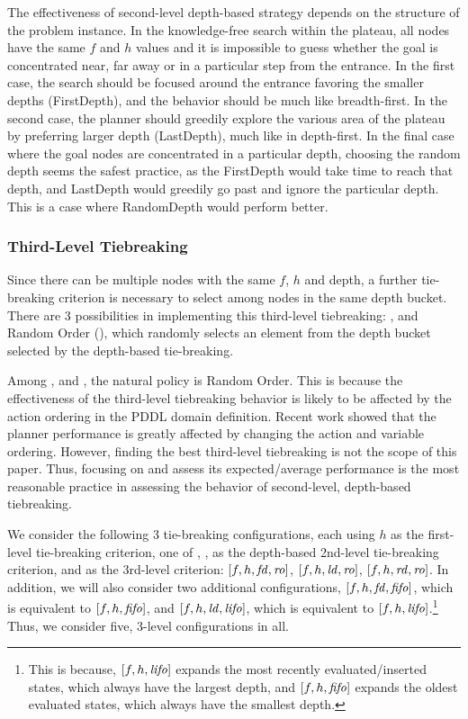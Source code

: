 The effectiveness of second-level depth-based strategy depends on the
structure of the problem instance.  In the knowledge-free search within
the plateau, all nodes have the same $f$ and $h$ values
and it is impossible to guess whether the goal is concentrated near, far
away or in a particular step from the entrance.  In the first case, the
search should be focused around the entrance favoring the smaller depths
(FirstDepth), and the behavior should be much like breadth-first. In the
second case, the planner should greedily explore the various area of the
plateau by preferring larger depth (LastDepth), much like in
depth-first. In the final case where the goal nodes are concentrated in
a particular depth, choosing the random depth seems the safest practice,
as the FirstDepth would take time to reach that depth, and LastDepth
would greedily go past and ignore the particular depth. This is a case
where RandomDepth would perform better.

\subsubsection{Third-Level Tiebreaking}

Since there can be multiple nodes with the same $f$, $h$ and depth,
a further tie-breaking criterion is necessary to select among nodes in the same depth bucket.
There are 3 possibilities in implementing this third-level tiebreaking:
\fifo, \lifo and Random Order (\ro), which
randomly selects an element from the depth bucket selected by the depth-based tie-breaking.

Among \fifo, \lifo and \ro, the natural policy is Random Order.
This is because the effectiveness of the third-level tiebreaking behavior
is likely to be affected by the action ordering in the PDDL domain
definition.  Recent work \cite{vallati2015effective} showed that the
planner performance is greatly affected by changing the action and
variable ordering. However, finding the best third-level tiebreaking is
not the scope of this paper.
Thus, focusing on \ro and assess its expected/average
performance is the most reasonable practice in assessing the behavior of second-level,
depth-based tiebreaking.

We consider the following 3 tie-breaking configurations, each using $h$
as the first-level tie-breaking criterion, one of \fd, \rd, \ld as the
depth-based 2nd-level tie-breaking criterion, and \ro as the 3rd-level
criterion:  $[f,h,\mbox{\textit{fd}},\mbox{\textit{ro}}]$, $[f,h,\mbox{\textit{ld}},\mbox{\textit{ro}}]$, $[f,h,\mbox{\textit{rd}},\mbox{\textit{ro}}]$. 
In addition, we will also consider two additional configurations, $[f,h,\mbox{\textit{fd}},\mbox{\textit{fifo}}]$, which is equivalent to $[f,h,\mbox{\textit{fifo}}]$, and $[f,h,\mbox{\textit{ld}},\mbox{\textit{lifo}}]$, which is equivalent to $[f,h,\mbox{\textit{lifo}}]$.\footnote{
This is because, $[f,h,\mbox{\textit{lifo}}]$ expands the most recently evaluated/inserted
states, which always have the largest depth, and $[f,h,\mbox{\textit{fifo}}]$ expands the oldest
evaluated states, which always have the smallest depth.}
Thus, we consider five, 3-level configurations in all.

